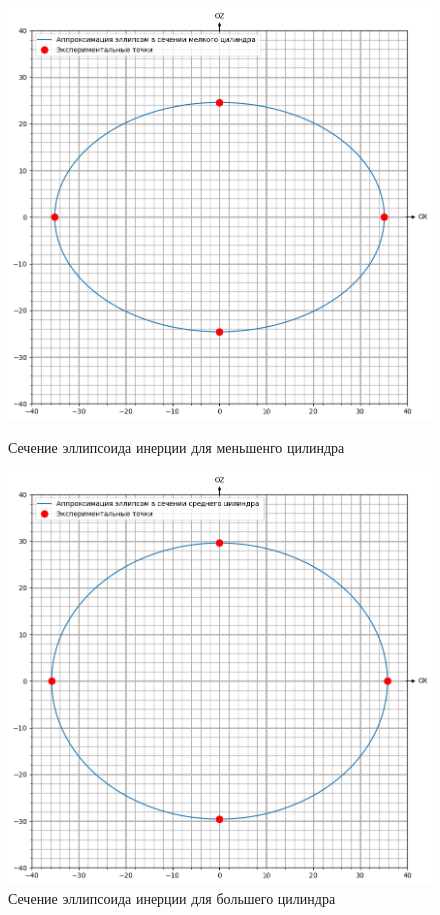 \documentclass[a4paper,12pt]{article} %
\begin{document}
\begin{itemize}
\begin{figure}[!ht]
    \begin{center}
    \begin{minipage}[h]{0.49\linewidth}
    \includegraphics[width=1\linewidth]{small}
    \caption{Сечение эллипсоида инерции для меньшенго цилиндра} %
    \end{minipage}
    \hfill
    \begin{minipage}[h]{0.49\linewidth}
    \includegraphics[width=1\linewidth]{middle}
    \caption{Сечение эллипсоида инерции для большего цилиндра}
    \end{minipage}
    \end{center}
\end{figure}


\end{itemize}
\end{document}
